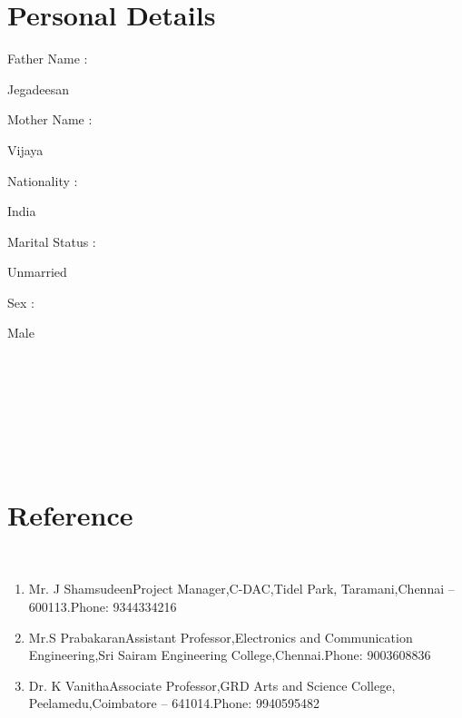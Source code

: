 \documentclass[letterpaper]{twentysecondcv} %
\begin{document}

\section{Personal Details}

	{\parbox[t]{0.18\textwidth}{Father Name :}}
	{Jegadeesan}\\
	{\parbox[t]{0.18\textwidth}{Mother Name :}}
	{Vijaya}\\
	{\parbox[t]{0.18\textwidth}{Nationality :}}
	{India}\\
	{\parbox[t]{0.18\textwidth}{Marital Status :}}
	{Unmarried}\\
	{\parbox[t]{0.18\textwidth}{Sex :}}
	{Male}\\\\\\\\
\\\\\\
\section{Reference}\\
\begin{enumerate}
  \item Mr. J Shamsudeen\newline Project Manager,\newline C-DAC,\newline Tidel Park, Taramani,\newline Chennai – 600113.\newline Phone: 9344334216
  \item Mr.S Prabakaran\newline  Assistant Professor,Electronics and Communication Engineering,\newline Sri Sairam Engineering College,\newline Chennai.\newline Phone: 9003608836
  \item Dr. K Vanitha\newline Associate Professor,\newline GRD Arts and Science College, Peelamedu,\newline Coimbatore – 641014.\newline Phone: 9940595482
\end{enumerate}
\end{document}
